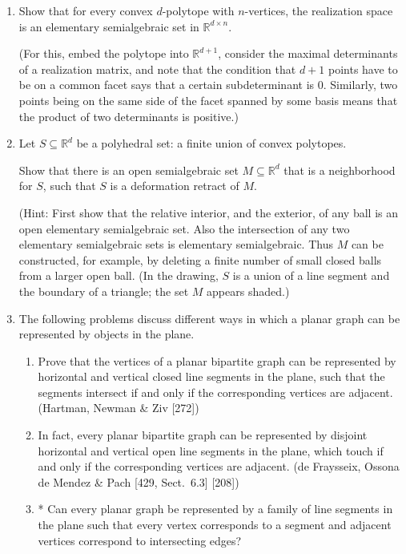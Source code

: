 \documentclass{article}
\begin{document}
\begin{enumerate}
\begin{solution}
    Indeed we can easily construct open intervals with rational endpoints, as well as single, rational points. For an algebraic number that is not rational, we must also pick up all its Galois conjugates (i.e. all the other roots of its minimal polynomial). These can either be singleton points (equality), or alternating open intervals (inequality).
\end{solution}

\item Show that for every convex $d$-polytope with $n$-vertices, the realization space is an elementary semialgebraic set in $\mathbb{R}^{d\times n}$.

(For this, embed the polytope into $\mathbb{R}^{d+1}$, consider the maximal determinants of a realization matrix, and note that the condition that $d+1$ points have to be on a common facet says that a certain subdeterminant is $0$. Similarly, two points being on the same side of the facet spanned by some basis means that the product of two determinants is positive.)

\item Let $S \subseteq \mathbb{R}^d$ be a polyhedral set: a finite union of convex polytopes.

Show that there is an open semialgebraic set $M \subseteq \mathbb{R}^d$ that is a neighborhood for $S$, such that $S$ is a deformation retract of $M$.

(Hint: First show that the relative interior, and the exterior, of any ball is an open elementary semialgebraic set. Also the intersection of any two elementary semialgebraic sets is elementary semialgebraic. Thus $M$ can be constructed, for example, by deleting a finite number of small closed balls from a larger open ball. (In the drawing, $S$ is a union of a line segment and the boundary of a triangle; the set $M$ appears shaded.)

\item The following problems discuss different ways in which a planar graph can be represented by objects in the plane. \begin{enumerate}[label=(\roman*)] \item Prove that the vertices of a planar bipartite graph can be represented by horizontal and vertical closed line segments in the plane, such that the segments intersect if and only if the corresponding vertices are adjacent. (Hartman, Newman \& Ziv [272]) \item In fact, every planar bipartite graph can be represented by disjoint horizontal and vertical open line segments in the plane, which touch if and only if the corresponding vertices are adjacent. (de Fraysseix, Ossona de Mendez \& Pach [429, Sect.\ 6.3] [208]) \item* Can every planar graph be represented by a family of line segments in the plane such that every vertex corresponds to a segment and adjacent vertices correspond to intersecting edges? \end{enumerate}


\end{enumerate}
\end{document}
